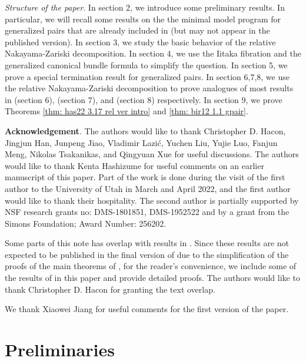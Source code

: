 \documentclass[11pt]{amsart}
\numberwithin{equation}{section}
\theoremstyle{definition}
\theoremstyle{definition}
\theoremstyle{definition}
\begin{document}
\noindent\textit{Structure of the paper}. In section 2, we introduce some preliminary results. In particular, we will recall some results on the the minimal model program for generalized pairs that are already included in \cite[Version 2, Version 3]{HL21} (but may not appear in the published version). In section 3, we study the basic behavior of the relative Nakayama-Zariski decomposition. In section 4, we use the Iitaka fibration and the generalized canonical bundle formula to simplify the question. In section 5, we prove a special termination result for generalized pairs. In section 6,7,8, we use the relative Nakayama-Zariski decomposition to prove analogues of most results in \cite[Section 3]{Has22} (section 6), \cite[Theorem 3.14]{Has22} (section 7), and \cite[Theorem 4.1]{Has20b} (section 8) respectively. In section 9, we prove Theorems \ref{thm: has22 3.17 rel ver intro} and \ref{thm: bir12 1.1 gpair}.


\medskip

\noindent\textbf{Acknowledgement}. The authors would like to thank Christopher D. Hacon, Jingjun Han, Junpeng Jiao, Vladimir Lazi\'c, Yuchen Liu, Yujie Luo, Fanjun Meng, Nikolas Tsakanikas, and Qingyuan Xue for useful discussions. The authors would like to thank Kenta Hashizume for useful comments on an earlier manuscript of this paper. Part of the work is done during the visit of the first author to the University of Utah in March and April 2022, and the first author would like to thank their hospitality. The second author is partially supported by NSF research grants no: DMS-1801851, DMS-1952522 and by a grant from the Simons Foundation; Award Number: 256202.

Some parts of this note has overlap with results in \cite[Version 2 or Version 3]{HL21}. Since these results are not expected to be published in the final version of \cite{HL21} due to the simplification of the proofs of the main theorems of \cite{HL21}, for the reader's convenience, we include some of the results of \cite[Version 2 or Version 3]{HL21} in this paper and provide detailed proofs. The authors would like to thank Christopher D. Hacon for granting the text overlap.

We thank Xiaowei Jiang for useful comments for the first version of the paper.

\medskip


\section{Preliminaries}
\end{document}
